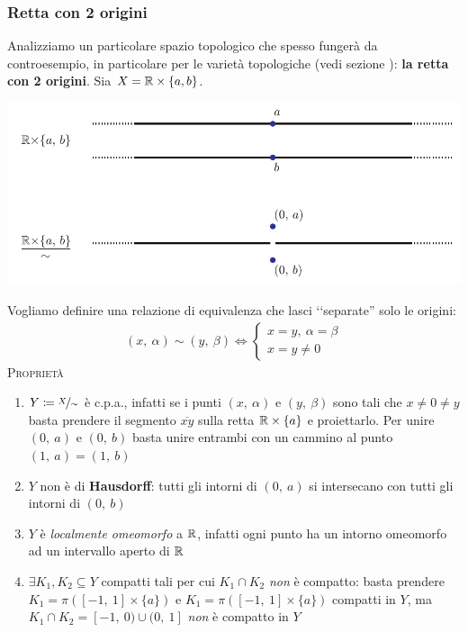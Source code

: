 \subsubsection{Retta con 2 origini} \label{retta 2 origini}
Analizziamo un particolare spazio topologico che spesso fungerà da controesempio, in particolare per le varietà topologiche (vedi sezione   ): \textbf{la retta con 2 origini}. \newline
Sia $X=\mathbb{R}\times\{a,b\}$.
\begin{center}
	\includegraphics[trim=0cm 0cm 0cm 0cm,clip,scale=0.95]{images/line2origins.pdf}
\end{center}
Vogliamo definire una relazione di equivalenza che lasci ‘‘separate'' solo le origini:
	\begin{gather*}
		(x, \ \alpha)\sim (y, \ \beta) \iff 
			\begin{cases}
				x=y,\ \alpha=\beta \\
				x=y\neq 0
			\end{cases}		
	\end{gather*}
\textsc{Proprietà}
\begin{enumerate}
	\item $Y\coloneqq \nicefrac{X}{\sim}$ è c.p.a., infatti se i punti $(x, \ \alpha)$ e $(y, \ \beta)$ sono tali che $x\neq 0 \neq y$ basta prendere il segmento $\overline{xy}$ sulla retta $\mathbb{R}\times\{a\}$ e proiettarlo. Per unire $(0,\ a)$ e $(0, \ b)$ basta unire entrambi con un cammino al punto $(1, \ a)=(1, \ b)$
	\item $Y$ non è di \textbf{Hausdorff}: tutti gli intorni di $(0, \ a)$ si intersecano con tutti gli 	intorni di $(0, \ b)$ 
	\item $Y$ è \textit{localmente omeomorfo} a $\mathbb{R}$, infatti ogni punto ha un intorno omeomorfo ad un intervallo aperto di $\mathbb{R}$
	\item $\exists K_1, K_2\subseteq Y$ compatti tali per cui $K_1\cap K_2$ \textit{non} è compatto: basta prendere $K_1=\pi\left([-1, \ 1]\times \{a\} \right)$ e $K_1=\pi\left([-1, \ 1]\times \{a\} \right)$ compatti in $Y$, ma $K_1\cap K_2= [-1,\ 0) \cup (0,\ 1]$ \textit{non} è compatto in $Y$
\end{enumerate}
